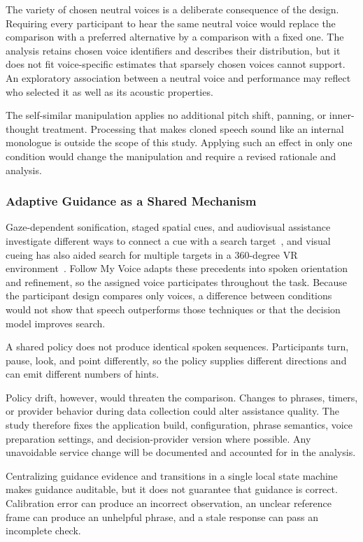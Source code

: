 The variety of chosen neutral voices is a deliberate consequence of the design. Requiring every participant to hear the same neutral voice would replace the comparison with a preferred alternative by a comparison with a fixed one. The analysis retains chosen voice identifiers and describes their distribution, but it does not fit voice-specific estimates that sparsely chosen voices cannot support. An exploratory association between a neutral voice and performance may reflect who selected it as well as its acoustic properties.

The self-similar manipulation applies no additional pitch shift, panning, or inner-thought treatment. Processing that makes cloned speech sound like an internal monologue is outside the scope of this study. Applying such an effect in only one condition would change the manipulation and require a revised rationale and analysis.

\subsubsection{Adaptive Guidance as a Shared Mechanism}
Gaze-dependent sonification, staged spatial cues, and audiovisual assistance investigate different ways to connect a cue with a search target~\cite{losing2014guiding,kwok2022twostep,binetti2021outofview,tanaka2026coarse}, and visual cueing has also aided search for multiple targets in a 360-degree VR environment~\cite{kelley2025cueing}. Follow My Voice adapts these precedents into spoken orientation and refinement, so the assigned voice participates throughout the task. Because the participant design compares only voices, a difference between conditions would not show that speech outperforms those techniques or that the decision model improves search.

A shared policy does not produce identical spoken sequences. Participants turn, pause, look, and point differently, so the policy supplies different directions and can emit different numbers of hints.

Policy drift, however, would threaten the comparison. Changes to phrases, timers, or provider behavior during data collection could alter assistance quality. The study therefore fixes the application build, configuration, phrase semantics, voice preparation settings, and decision-provider version where possible. Any unavoidable service change will be documented and accounted for in the analysis.

Centralizing guidance evidence and transitions in a single local state machine makes guidance auditable, but it does not guarantee that guidance is correct. Calibration error can produce an incorrect observation, an unclear reference frame can produce an unhelpful phrase, and a stale response can pass an incomplete check.

